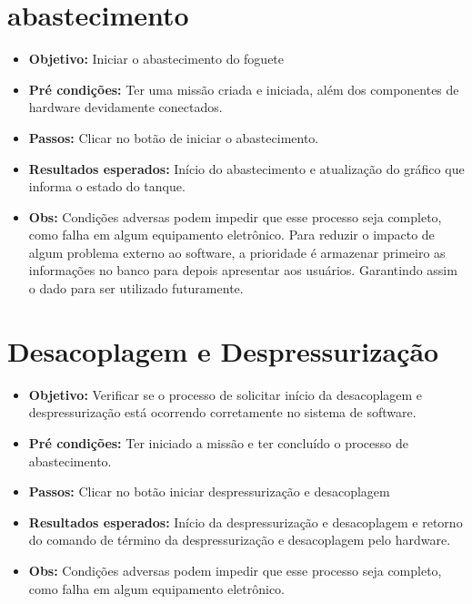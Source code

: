 \begin{apendicesenv}
\section{abastecimento}
\begin{itemize} 
    \item \textbf{Objetivo:} Iniciar o abastecimento do foguete
    \item \textbf{Pré condições:} Ter uma missão criada e iniciada, além dos componentes de hardware devidamente conectados.
    \item \textbf{Passos:} Clicar no botão de iniciar o abastecimento.
    \item \textbf{Resultados esperados:} Início do abastecimento e atualização do gráfico que informa o estado do tanque.
    \item \textbf{Obs:} Condições adversas podem impedir que esse processo seja completo, como falha em algum equipamento eletrônico. Para reduzir o impacto de algum problema externo ao software, a prioridade é armazenar primeiro as informações no banco para depois apresentar aos usuários. Garantindo assim o dado para ser utilizado futuramente.
\end{itemize}

\section{Desacoplagem e Despressurização}
\begin{itemize} 
    \item \textbf{Objetivo:} Verificar se o processo de solicitar início da desacoplagem e despressurização está ocorrendo corretamente no sistema de software.
    \item \textbf{Pré condições:}  Ter iniciado a missão e ter concluído o processo de abastecimento.
    \item \textbf{Passos:} Clicar no botão iniciar despressurização e desacoplagem
    \item \textbf{Resultados esperados:} Início da despressurização e desacoplagem e retorno do comando de término da despressurização e desacoplagem pelo hardware.
    \item \textbf{Obs:} Condições adversas podem impedir que esse processo seja completo, como falha em algum equipamento eletrônico.
\end{itemize}


\end{apendicesenv}
